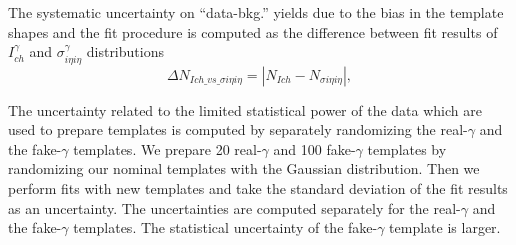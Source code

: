 The systematic uncertainty on ``data-bkg.'' yields due to the bias in the template shapes and the fit procedure is computed as the difference between fit results of $I_{ch}^\gamma$ and $\sigma_{i\eta i\eta}^\gamma$ distributions
\begin{equation}
  \Delta N_{Ich\_vs\_\sigma i\eta i\eta} = |N_{Ich}-N_{\sigma i\eta i\eta}|,
\end{equation}

The uncertainty related to the limited statistical power of the data which are used to prepare templates is computed by separately randomizing the real-$\gamma$ and the fake-$\gamma$ templates. We prepare 20 real-$\gamma$ and 100 fake-$\gamma$ templates by randomizing our nominal templates with the Gaussian distribution. Then we perform fits with new templates and take the standard deviation of the fit results as an uncertainty. The uncertainties are computed separately for the real-$\gamma$ and the fake-$\gamma$ templates. The statistical uncertainty of the fake-$\gamma$ template is larger.

